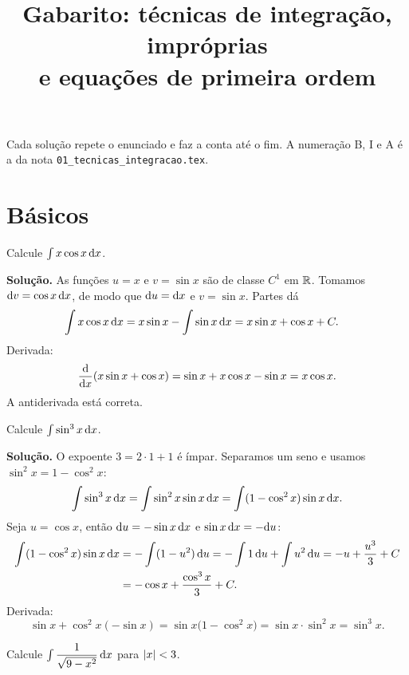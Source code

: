 \documentclass[11pt,a4paper]{article}
\title{Gabarito: técnicas de integração, impróprias\\ e equações de primeira ordem}
\author{}
\date{}
\begin{document}
\maketitle
\tableofcontents

Cada solução repete o enunciado e faz a conta até o fim. A numeração B, I e A é a da nota \texttt{01\_tecnicas\_integracao.tex}.

\section{Básicos}

\begin{exercicio}[Básico --- B1]
Calcule \(\int x\cos x\,\mathrm{d} x\).
\end{exercicio}

\noindent\textbf{Solução.}
As funções \(u=x\) e \(v=\sin x\) são de classe \(C^1\) em \(\mathbb{R}\). Tomamos \(\mathrm{d} v=\cos x\,\mathrm{d} x\), de modo que \(\mathrm{d} u=\mathrm{d} x\) e \(v=\sin x\). Partes dá
\begin{align*}
\int x\cos x\,\mathrm{d} x
&=x\sin x-\int\sin x\,\mathrm{d} x
=x\sin x+\cos x+C.
\end{align*}
Derivada:
\[
\frac{\mathrm{d}}{\mathrm{d} x}(x\sin x+\cos x)
=\sin x+x\cos x-\sin x
=x\cos x.
\]
A antiderivada está correta.

\begin{exercicio}[Básico --- B2]
Calcule \(\int\sin^{3}x\,\mathrm{d} x\).
\end{exercicio}

\noindent\textbf{Solução.}
O expoente \(3=2\cdot 1+1\) é ímpar. Separamos um seno e usamos \(\sin^{2}x=1-\cos^{2}x\):
\[
\int\sin^{3}x\,\mathrm{d} x
=\int\sin^{2}x\sin x\,\mathrm{d} x
=\int(1-\cos^{2}x)\sin x\,\mathrm{d} x.
\]
Seja \(u=\cos x\), então \(\mathrm{d} u=-\sin x\,\mathrm{d} x\) e \(\sin x\,\mathrm{d} x=-\mathrm{d} u\):
\begin{align*}
\int(1-\cos^{2}x)\sin x\,\mathrm{d} x
&=-\int(1-u^{2})\,\mathrm{d} u
=-\int 1\,\mathrm{d} u+\int u^{2}\,\mathrm{d} u
=-u+\frac{u^{3}}{3}+C\\
&=-\cos x+\frac{\cos^{3}x}{3}+C.
\end{align*}
Derivada:
\[
\sin x+\cos^{2}x(-\sin x)
=\sin x\bigl(1-\cos^{2}x\bigr)
=\sin x\cdot\sin^{2}x
=\sin^{3}x.
\]

\begin{exercicio}[Básico --- B3]
Calcule \(\int\dfrac{1}{\sqrt{9-x^{2}}}\,\mathrm{d} x\) para \(\left\lvert x \right\rvert<3\).
\end{exercicio}
\end{document}
